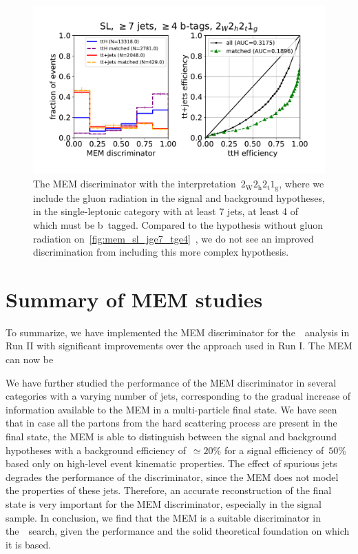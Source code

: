 \begin{figure}
\begin{centering}
\includegraphics[width = 1.0\textwidth]{figures/mem_sl_jge7_tge4_1g.pdf}
\caption[The MEM discriminator with the~$2_{\mathrm{W}} 2_{\mathrm{h}} 2_{\mathrm{t}} 1_{\mathrm{g}}$ interpretation in the $\ge7$ jet, $\ge4$ b-tag category.]{The MEM discriminator with the interpretation~$2_{\mathrm{W}} 2_{\mathrm{h}} 2_{\mathrm{t}} 1_{\mathrm{g}}$, where we include the gluon radiation in the signal and background hypotheses, in the single-leptonic category with at least 7 jets, at least 4 of which must be b~tagged. Compared to the hypothesis without gluon radiation on~\cref{fig:mem_sl_jge7_tge4}~, we do not see an improved discrimination from including this more complex hypothesis.}
\label{fig:mem_sl_jge7_tge4_7jet}
\end{centering}
\end{figure}

\section{Summary of MEM studies}
To summarize, we have implemented the MEM discriminator for the~\ttHbb~analysis in Run II with significant improvements over the approach used in Run I. The MEM can now be 

We have further studied the performance of the MEM discriminator in several categories with a varying number of jets, corresponding to the gradual increase of information available to the MEM in a multi-particle final state. We have seen that in case all the partons from the hard scattering process are present in the final state, the MEM is able to distinguish between the signal and background hypotheses with a background efficiency of~$\simeq 20\%$ for a signal efficiency of~$50\%$ based only on high-level event kinematic properties. The effect of spurious jets degrades the performance of the discriminator, since the MEM does not model the properties of these jets. Therefore, an accurate reconstruction of the final state is very important for the MEM discriminator, especially in the signal sample.
 In conclusion, we find that the MEM is a suitable discriminator in the~\ttHbb~search, given the performance and the solid theoretical foundation on which it is based.
